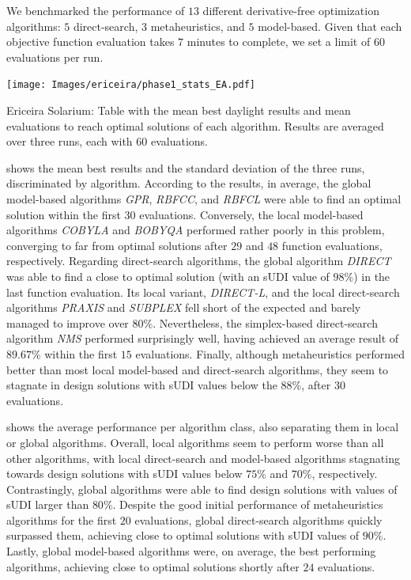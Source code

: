  We benchmarked the performance of $13$ different derivative-free optimization algorithms: $5$ direct-search, $3$ metaheuristics, and $5$ model-based. Given that each objective function evaluation takes $7$ minutes to complete, we set a limit of $60$ evaluations per run.

\begin{table}[]
	\centering
	\texttt{[image: Images/ericeira/phase1\_stats\_EA.pdf]}	
	\caption{Ericeira Solarium: Table with the mean best daylight results and mean evaluations to reach optimal solutions of each algorithm. Results are averaged over three runs, each with $60$ evaluations.}
	\label{table:phase1results}
\end{table}

 shows the mean best results and the standard deviation of the three runs, discriminated by algorithm. According to the results, in average, the global model-based algorithms \textit{GPR}, \textit{RBFCC}, and \textit{RBFCL} were able to find an optimal solution within the first $30$ evaluations. Conversely, the local model-based algorithms \textit{\ac{COBYLA}} and \textit{\ac{BOBYQA}} performed rather poorly in this problem, converging to far from optimal solutions after $29$ and $48$ function evaluations, respectively. Regarding direct-search algorithms, the global algorithm \textit{\ac{DIRECT}} was able to find a close to optimal solution (with an \ac{sUDI} value of $98\%$) in the last function evaluation. Its local variant, \textit{\ac{DIRECT}-L}, and the local direct-search algorithms \textit{\ac{PRAXIS}} and \textit{SUBPLEX} fell short of the expected and barely managed to improve over $80\%$. Nevertheless, the simplex-based direct-search algorithm \textit{\ac{NMS}} performed surprisingly well, having achieved an average result of $89.67\%$ within the first $15$ evaluations. Finally, although metaheuristics performed better than most local model-based and direct-search algorithms, they seem to stagnate in design solutions with \ac{sUDI} values below the $88\%$, after $30$ evaluations.

 shows the average performance per algorithm class, also separating them in local or global algorithms. Overall, local algorithms seem to perform worse than all other algorithms, with local direct-search and model-based algorithms stagnating towards design solutions with \ac{sUDI} values below $75\%$ and $70\%$, respectively. Contrastingly, global algorithms were able to find design solutions with values of \ac{sUDI} larger than $80\%$. Despite the good initial performance of metaheuristics algorithms for the first $20$ evaluations, global direct-search algorithms quickly surpassed them, achieving close to optimal solutions with \ac{sUDI} values of $90\%$. Lastly, global model-based algorithms were, on average, the best performing algorithms, achieving close to optimal solutions shortly after $24$ evaluations. 

